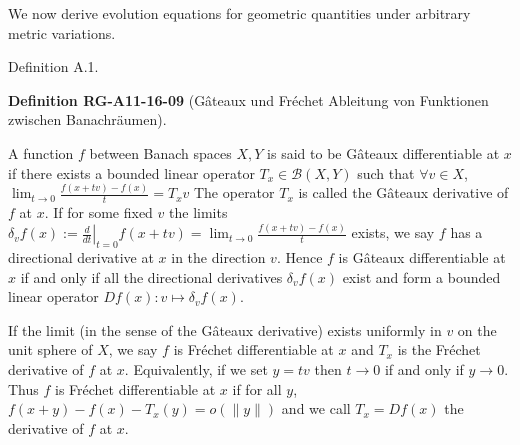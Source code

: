 \documentclass[10pt, letterpaper]{article}
\newcommand{\CustomHeading}[3]{%
  \par\medskip\noindent%
  \textbf{#1 #2} \textnormal{(#3)}.\enskip%
}
\newenvironment{DEF}[2]{\begin{unitbox}\CustomHeading{Definition}{#1}{#2}}{\end{unitbox}}
\begin{document}
We now derive evolution equations for geometric quantities under arbitrary metric variations. 


Definition A.1. 

\begin{DEF}{RG-A11-16-09}{Gâteaux und Fréchet Ableitung von Funktionen zwischen Banachräumen}
A function $f$ between Banach spaces $X,Y$ is said to be Gâteaux differentiable at $x$ if there exists a bounded linear operator $T_x \in \mathcal{B}(X, Y)$ such that $\forall v \in X$,
$
\lim _{t \rightarrow 0} \frac{f(x+t v)-f(x)}{t}=T_x v
$
The operator $T_x$ is called the Gâteaux derivative of $f$ at $x$.
If for some fixed $v$ the limits
$
\delta_v f(x):=\left.\frac{d}{d t}\right|_{t=0} f(x+t v)=\lim _{t \rightarrow 0} \frac{f(x+t v)-f(x)}{t}
$
exists, we say $f$ has a directional derivative at $x$ in the direction $v$. Hence $f$ is Gâteaux differentiable at $x$ if and only if all the directional derivatives $\delta_v f(x)$ exist and form a bounded linear operator $D f(x): v \mapsto \delta_v f(x)$.

If the limit (in the sense of the Gâteaux derivative) exists uniformly in $v$ on the unit sphere of $X$, we say $f$ is Fréchet differentiable at $x$ and $T_x$ is the Fréchet derivative of $f$ at $x$. Equivalently, if we set $y=t v$ then $t \rightarrow 0$ if and only if $y \rightarrow 0$. Thus $f$ is Fréchet differentiable at $x$ if for all $y$,
$
f(x+y)-f(x)-T_x(y)=o(\|y\|)
$
and we call $T_x=D f(x)$ the derivative of $f$ at $x$.
\end{DEF}
\end{document}
